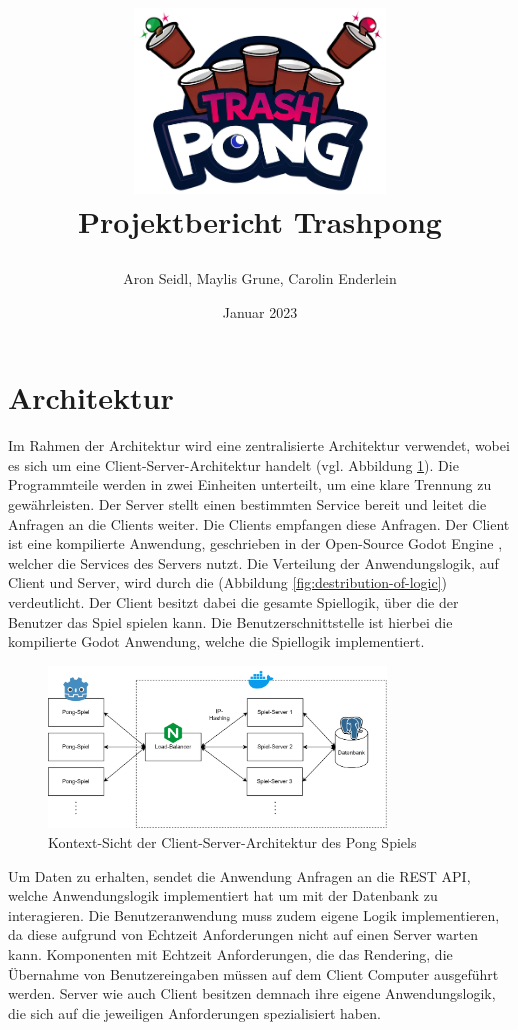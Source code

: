 \documentclass[
]{article}
\title{
  \begin{center}
    \includegraphics[width=0.5\textwidth]{resources/header.png} \\
    Projektbericht Trashpong
  \end{center}
}
\author{Aron Seidl, Maylis Grune, Carolin Enderlein}
\date{Januar 2023}
\begin{document}
\maketitle

\hypertarget{section-introduction-and-goals}{%
\section{Architektur}\label{section-introduction-and-goals}}

Im Rahmen der Architektur wird eine zentralisierte Architektur verwendet, wobei es sich um eine Client-Server-Architektur handelt (vgl. Abbildung \ref{fig:clientserver}).
Die Programmteile werden in zwei Einheiten unterteilt, um eine klare Trennung zu gewährleisten. 
Der Server stellt einen bestimmten Service bereit und leitet die Anfragen an die Clients weiter. 
Die Clients empfangen diese Anfragen.\cite{tanenbaum2007distributed}
Der Client ist eine kompilierte Anwendung, geschrieben in der Open-Source Godot Engine \cite{godot}, welcher die
Services des Servers nutzt. 
Die Verteilung der Anwendungslogik, auf Client und Server, wird durch die (Abbildung \ref{fig:destribution-of-logic}) verdeutlicht.
Der Client besitzt dabei die gesamte Spiellogik, über die der Benutzer das Spiel spielen kann. 
Die Benutzerschnittstelle ist hierbei die kompilierte Godot Anwendung, welche die Spiellogik implementiert.

\begin{figure}[H]
	\centering
	\includegraphics[width=0.8\textwidth ]{resources/Client-Server.drawio.png}
	\caption{Kontext-Sicht der Client-Server-Architektur des Pong Spiels}
	\label{fig:clientserver}
\end{figure}


Um Daten zu erhalten, sendet die Anwendung Anfragen an die REST API, welche Anwendungslogik implementiert hat um mit der Datenbank zu interagieren.
Die Benutzeranwendung muss zudem eigene Logik implementieren, da diese aufgrund von Echtzeit Anforderungen nicht auf einen Server warten kann.
Komponenten mit Echtzeit Anforderungen, die das  Rendering, die Übernahme von Benutzereingaben müssen auf dem Client Computer ausgeführt werden.
Server wie auch Client besitzen demnach ihre eigene Anwendungslogik, die sich auf die jeweiligen Anforderungen spezialisiert haben.
\end{document}
